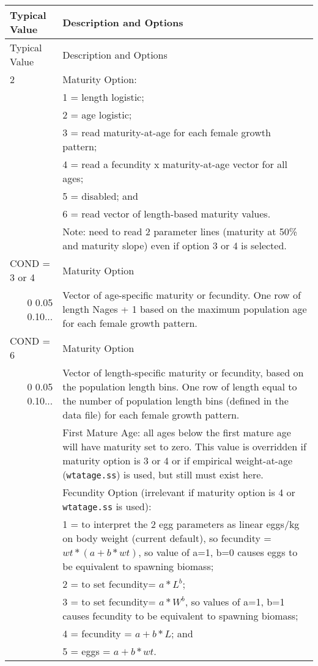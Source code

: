 \begin{longtable}{p{0.5cm} p{2cm} p{13cm}}
	\hline	
	\multicolumn{2}{l}{Typical Value} & Description and Options \Tstrut\Bstrut\\
	\hline
	\endfirsthead

	\hline
	\multicolumn{2}{l}{Typical Value} & Description and Options \Tstrut\Bstrut\\
	\hline
	\endhead
	\hline

	\endfoot
	
	\endlastfoot

	2 & & Maturity Option: \Tstrut\\
	  & & 1 = length logistic; \\
	  & & 2 = age logistic; \\
	  & & 3 = read maturity-at-age for each female growth pattern; \\
	  & & 4 = read a fecundity x maturity-at-age vector for all ages; \\
	  & & 5 = disabled; and \\
	  & & 6 = read vector of length-based maturity values. \\
	  & & Note: need to read 2 parameter lines (maturity at 50\% and maturity slope) even if option 3 or 4 is selected. \Bstrut\\
	\hline

	\multicolumn{2}{l}{COND = 3 or 4} & Maturity Option \Tstrut\\
	\multicolumn{2}{r}{0 0.05 0.10...} & Vector of age-specific maturity or fecundity. One row of length Nages + 1 based on the maximum population age for each female growth pattern. \Bstrut\\
	\multicolumn{2}{l}{COND = 6} & Maturity Option \Tstrut\\
	\multicolumn{2}{r}{0 0.05 0.10...} & Vector of length-specific maturity or fecundity, based on the population length bins. One row of length equal to the number of population length bins (defined in the data file) for each female growth pattern. \Bstrut\\
	\hline
	
	\Tstrut 1 & & First Mature Age: all ages below the first mature age will have maturity set to zero. This value is overridden if maturity option is 3 or 4 or if empirical weight-at-age (\texttt{wtatage.ss}) is used, but still must exist here. \Bstrut\\
	\hline

	\Tstrut 1 & & Fecundity Option (irrelevant if maturity option is 4 or \texttt{wtatage.ss} is used): \\
	  & & 1 = to interpret the 2 egg parameters as linear eggs/kg on body weight (current default), so fecundity = $wt * (a+b*wt)$, so value of a=1, b=0 causes eggs to be equivalent to spawning biomass; \\
	  & & 2 = to set fecundity= $a*L^ b$; \\
	  & & 3 = to set fecundity= $a*W^ b$, so values of a=1, b=1 causes fecundity to be equivalent to spawning biomass; \\
	  & & 4 = fecundity = $a+b*L$; and \\
	  & & 5 = eggs = $a+b*wt$. \Bstrut\\
	\hline
\end{longtable}

